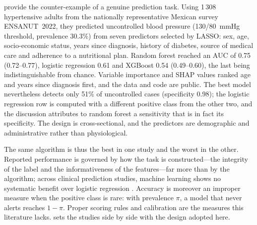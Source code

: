 \Textcite{mendoza2025} provide the counter-example of a genuine prediction task. Using 1\,308 hypertensive adults from the nationally representative Mexican survey ENSANUT~2022, they predicted uncontrolled blood pressure (130/80~mmHg threshold, prevalence 30.3\%) from seven predictors selected by LASSO: sex, age, socio-economic status, years since diagnosis, history of diabetes, source of medical care and adherence to a nutritional plan. Random forest reached an AUC of 0.75 (0.72--0.77), logistic regression 0.61 and XGBoost 0.54 (0.49--0.60), the last being indistinguishable from chance. Variable importance and SHAP values ranked age and years since diagnosis first, and the data and code are public. The best model nevertheless detects only 51\% of uncontrolled cases (specificity 0.98); the logistic regression row is computed with a different positive class from the other two, and the discussion attributes to random forest a sensitivity that is in fact its specificity. The design is cross-sectional, and the predictors are demographic and administrative rather than physiological.

The same algorithm is thus the best in one study and the worst in the other. Reported performance is governed by how the task is constructed---the integrity of the label and the informativeness of the features---far more than by the algorithm; across clinical prediction studies, machine learning shows no systematic benefit over logistic regression \parencite{christodoulou2019}. Accuracy is moreover an improper measure when the positive class is rare: with prevalence $\pi$, a model that never alerts reaches $1-\pi$. Proper scoring rules \parencite{gneiting2007} and calibration \parencite{vancalster2019} are the measures this literature lacks.  sets the studies side by side with the design adopted here.

